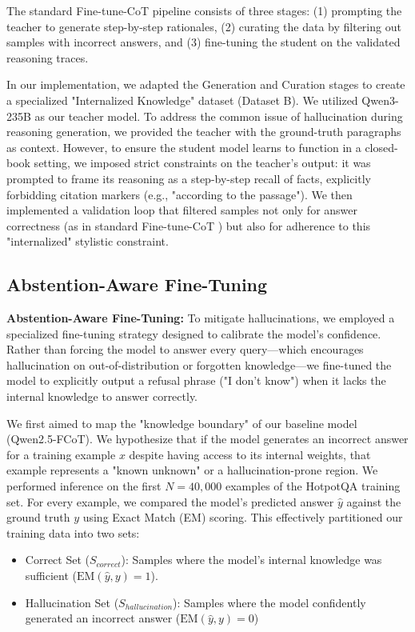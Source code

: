 \documentclass{article}
\begin{document}
The standard Fine-tune-CoT pipeline consists of three stages: (1) prompting the teacher to generate step-by-step rationales, (2) curating the data by filtering out samples with incorrect answers, and (3) fine-tuning the student on the validated reasoning traces.

In our implementation, we adapted the Generation and Curation stages to create a specialized "Internalized Knowledge" dataset (Dataset B). We utilized Qwen3-235B as our teacher model. To address the common issue of hallucination during reasoning generation, we provided the teacher with the ground-truth paragraphs as context. However, to ensure the student model learns to function in a closed-book setting, we imposed strict constraints on the teacher's output: it was prompted to frame its reasoning as a step-by-step recall of facts, explicitly forbidding citation markers (e.g., "according to the passage"). We then implemented a validation loop that filtered samples not only for answer correctness (as in standard Fine-tune-CoT ) but also for adherence to this "internalized" stylistic constraint.

\subsection{Abstention-Aware Fine-Tuning} \label{sec:abstension}
\textbf{Abstention-Aware Fine-Tuning: }To mitigate hallucinations, we employed a specialized fine-tuning strategy designed to calibrate the model's confidence. Rather than forcing the model to answer every query—which encourages hallucination on out-of-distribution or forgotten knowledge—we fine-tuned the model to explicitly output a refusal phrase ("I don't know") when it lacks the internal knowledge to answer correctly. 

We first aimed to map the "knowledge boundary" of our baseline model (Qwen2.5-FCoT). We hypothesize that if the model generates an incorrect answer for a training example $x$ despite having access to its internal weights, that example represents a "known unknown" or a hallucination-prone region. We performed inference on the first $N=40,000$ examples of the HotpotQA training set. For every example, we compared the model's predicted answer $\hat{y}$ against the ground truth $y$ using Exact Match (EM) scoring. This effectively partitioned our training data into two sets: 
\begin{itemize}
    \item Correct Set ($S_{correct}$): Samples where the model's internal knowledge was sufficient ($\text{EM}(\hat{y}, y) = 1$). 
    \item Hallucination Set ($S_{hallucination}$): Samples where the model confidently generated an incorrect answer ($\text{EM}(\hat{y}, y) = 0$)
\end{itemize}
\end{document}
